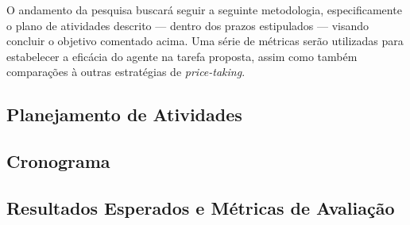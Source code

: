 
O andamento da pesquisa buscará seguir a seguinte metodologia, especificamente o plano de atividades descrito — dentro dos prazos estipulados — visando concluir o objetivo comentado acima. Uma série de métricas serão utilizadas para estabelecer a eficácia do agente na tarefa proposta, assim como também comparações à outras estratégias de \textit{price-taking}.

\subsection{Planejamento de Atividades}
\label{section:activities}


\subsection{Cronograma}
\label{section:chronogram}


\subsection{Resultados Esperados e Métricas de Avaliação}
\label{section:metrics}


